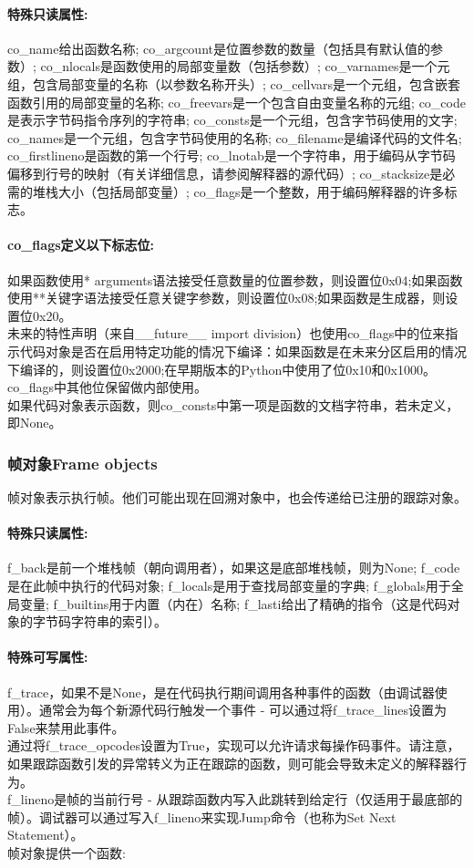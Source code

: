 \documentclass[10pt,UTF8]{ctexart}
\begin{document}
\begin{flushleft}
\paragraph{特殊只读属性:}co_name给出函数名称; co_argcount是位置参数的数量（包括具有默认值的参数）; co_nlocals是函数使用的局部变量数（包括参数）; co_varnames是一个元组，包含局部变量的名称（以参数名称开头）; co_cellvars是一个元组，包含嵌套函数引用的局部变量的名称; co_freevars是一个包含自由变量名称的元组; co_code是表示字节码指令序列的字符串; co_consts是一个元组，包含字节码使用的文字; co_names是一个元组，包含字节码使用的名称; co_filename是编译代码的文件名; co_firstlineno是函数的第一个行号; co_lnotab是一个字符串，用于编码从字节码偏移到行号的映射（有关详细信息，请参阅解释器的源代码）; co_stacksize是必需的堆栈大小（包括局部变量）; co_flags是一个整数，用于编码解释器的许多标志。\\
\paragraph{co_flags定义以下标志位:}如果函数使用* arguments语法接受任意数量的位置参数，则设置位0x04;如果函数使用**关键字语法接受任意关键字参数，则设置位0x08;如果函数是生成器，则设置位0x20。\\
\indent 未来的特性声明（来自__future__ import division）也使用co_flags中的位来指示代码对象是否在启用特定功能的情况下编译：如果函数是在未来分区启用的情况下编译的，则设置位0x2000;在早期版本的Python中使用了位0x10和0x1000。\\
\indent co_flags中其他位保留做内部使用。\\
\indent 如果代码对象表示函数，则co_consts中第一项是函数的文档字符串，若未定义，即None。
\subsubsection{帧对象Frame objects}
帧对象表示执行帧。他们可能出现在回溯对象中，也会传递给已注册的跟踪对象。
\paragraph{特殊只读属性:}f_back是前一个堆栈帧（朝向调用者），如果这是底部堆栈帧，则为None; f_code是在此帧中执行的代码对象; f_locals是用于查找局部变量的字典; f_globals用于全局变量; f_builtins用于内置（内在）名称; f_lasti给出了精确的指令（这是代码对象的字节码字符串的索引）。
\paragraph{特殊可写属性:}f_trace，如果不是None，是在代码执行期间调用各种事件的函数（由调试器使用）。通常会为每个新源代码行触发一个事件 - 可以通过将f_trace_lines设置为False来禁用此事件。\\
\indent  通过将f_trace_opcodes设置为True，实现可以允许请求每操作码事件。请注意，如果跟踪函数引发的异常转义为正在跟踪的函数，则可能会导致未定义的解释器行为。\\
\indent f_lineno是帧的当前行号 - 从跟踪函数内写入此跳转到给定行（仅适用于最底部的帧）。调试器可以通过写入f_lineno来实现Jump命令（也称为Set Next Statement）。\\
帧对象提供一个函数:

\end{flushleft}
\end{document}
